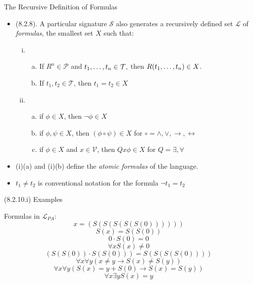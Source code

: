 \begin{frame}{The Recursive Definition of Formulas}

	\begin{itemize}%
	\itemsep=16pt
	
			\item (8.2.8). A particular signature $\mathcal{S}$ also generates a recursively defined set $\mathcal{L}$ of \emph{formulas}, the smallest set $X$ such that:
		\begin{enumerate}[(i)]
		
			\item \begin{enumerate}[(a)]
			
				\item If $R^n\in\mathcal{P}$ and $t_1, \mathellipsis, t_n\in \mathcal{T},$ then $R(t_1, \mathellipsis, t_n)\in X$.
				
				\item If $t_1,t_2\in \mathcal{T}$, then $t_1=t_2\in X$
				
				\end{enumerate}
			
			\item \begin{enumerate}[(a)]
			
				\item if $\phi\in X$, then $\neg \phi\in X$
				
				\item if $\phi,\psi\in X$, then $(\phi\circ\psi)\in X$ for $\circ=\land,\lor,\to,\leftrightarrow$
				
				\item if $\phi\in X$ and $x\in \mathcal{V}$, then $Qx\phi\in X$ for $Q=\exists,\forall$
			
			\end{enumerate}
							
		\end{enumerate}
		
		\item (i)(a) and (i)(b) define the \emph{atomic formulas} of the language.
		
		\item $t_1\neq t_2$ is conventional notation for the formula $\neg{t_1=t_2}$

	
	\end{itemize}

\end{frame}

\begin{frame}{(8.2.10.i) Examples}

Formulas in $\mathcal{L}_{PA}$:
					\[x=(S(S(S(S(S(0))))))\]
					\[S(x)=S(S(0))\]
					\[0\cdot S(0)=0\]
					\[\forall x S(x)\neq 0\]
					\[(S(S(0))\cdot S(S(0)))=S(S(S(S(0))))\]
					\[\forall x\forall y(x\neq y\to S(x)\neq S(y))\]
					\[\forall x\forall y(S(x)=y+S(0)\to S(x)=S(y))\]
					\[\forall x\exists yS(x)=y\]


\end{frame}

